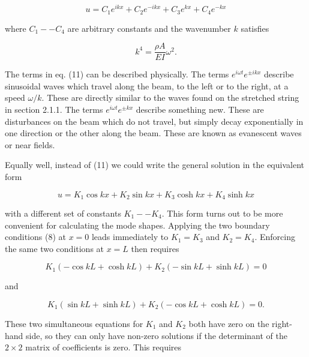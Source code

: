   \begin{equation*}u=C_1 e^{ikx} + C_2 e^{-ikx} + C_3 e^{kx} + C_4 e^{-kx} 
  \tag{11}\end{equation*} 

  \noindent{}where $C_1 -- C_4$ are arbitrary constants and the wavenumber $k$ 
  satisfies 

  \begin{equation*}k^4 = \dfrac{\rho A}{EI}\omega^2 . \tag{12}\end{equation*} 

  The terms in eq. (11) can be described physically. The terms $e^{i \omega t} 
  e^{\pm i k x}$ describe sinusoidal waves which travel along the beam, to the 
  left or to the right, at a speed $\omega/k$. These are directly similar to 
  the waves found on the stretched string in section 2.1.1. The terms $e^{i 
  \omega t} e^{\pm k x}$ describe something new. These are disturbances on the 
  beam which do not travel, but simply decay exponentially in one direction or 
  the other along the beam. These are known as evanescent waves or near fields. 

  Equally well, instead of (11) we could write the general solution in the 
  equivalent form 

  \begin{equation*}u=K_1 \cos kx + K_2 \sin kx + K_3 \cosh kx + K_4 \sinh kx 
  \tag{13}\end{equation*} 

  \noindent{}with a different set of constants $K_1 -- K_4$. This form turns 
  out to be more convenient for calculating the mode shapes. Applying the two 
  boundary conditions (8) at $x=0$ leads immediately to $K_1=K_3$ and 
  $K_2=K_4$. Enforcing the same two conditions at $x=L$ then requires 

  \begin{equation*}K_1 (-\cos kL +\cosh kL) +K_2 (-\sin kL +\sinh kL)=0 
  \tag{14}\end{equation*} 

  \noindent{}and 

  \begin{equation*}K_1 (\sin kL +\sinh kL) + K_2(-\cos kL +\cosh kL)=0. 
  \tag{15}\end{equation*} 

  These two simultaneous equations for $K_1$ and $K_2$ both have zero on the 
  right-hand side, so they can only have non-zero solutions if the determinant 
  of the $2 \times 2$ matrix of coefficients is zero. This requires 

